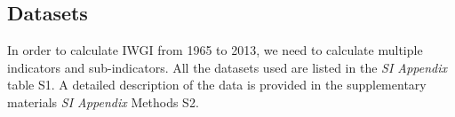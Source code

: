 


	\subsection{Datasets}
	In order to calculate IWGI from 1965 to 2013, we need to calculate multiple indicators and sub-indicators. All the datasets used are listed in the \textit{SI Appendix} table S1. A detailed description of the data is provided in the supplementary materials \textit{SI Appendix} Methods S2.
